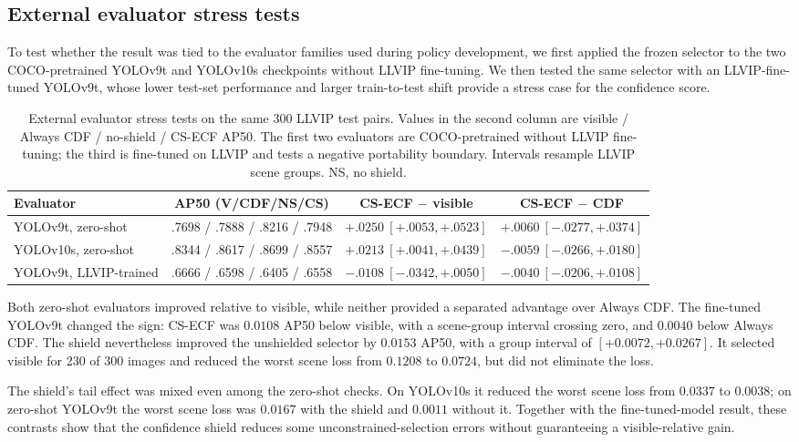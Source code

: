 \documentclass[preprint,11pt]{elsarticle}
\begin{document}
\subsection{External evaluator stress tests}

To test whether the result was tied to the evaluator families used during
policy development, we first applied the frozen selector to the two
COCO-pretrained YOLOv9t and YOLOv10s checkpoints without LLVIP fine-tuning.
We then tested the same selector with an LLVIP-fine-tuned YOLOv9t, whose lower
test-set performance and larger train-to-test shift provide a stress case for
the confidence score.

\begin{table}[t]
\centering
\scriptsize
\setlength{\tabcolsep}{3pt}
\caption{External evaluator stress tests on the same 300 LLVIP test pairs.
Values in the second column are visible / Always CDF / no-shield / CS-ECF AP50.
The first two evaluators are COCO-pretrained without LLVIP fine-tuning; the
third is fine-tuned on LLVIP and tests a negative portability boundary.
Intervals resample LLVIP scene groups. NS, no shield.}
\label{tab:independent}
\begin{tabular}{@{}lccc@{}}
\toprule
Evaluator & AP50 (V/CDF/NS/CS) &
CS-ECF \(-\) visible & CS-ECF \(-\) CDF \\
\midrule
YOLOv9t, zero-shot & .7698 / .7888 / .8216 / .7948 &
\(+.0250~[+.0053,+.0523]\) & \(+.0060~[-.0277,+.0374]\) \\
YOLOv10s, zero-shot & .8344 / .8617 / .8699 / .8557 &
\(+.0213~[+.0041,+.0439]\) & \(-.0059~[-.0266,+.0180]\) \\
YOLOv9t, LLVIP-trained & .6666 / .6598 / .6405 / .6558 &
\(-.0108~[-.0342,+.0050]\) & \(-.0040~[-.0206,+.0108]\) \\
\bottomrule
\end{tabular}
\end{table}

Both zero-shot evaluators improved relative to visible, while neither provided
a separated advantage over Always CDF. The fine-tuned YOLOv9t changed the sign:
CS-ECF was \(0.0108\) AP50 below visible, with a scene-group interval crossing
zero, and \(0.0040\) below Always CDF. The shield nevertheless improved the
unshielded selector by \(0.0153\) AP50, with a group interval of
\([+0.0072,+0.0267]\). It selected visible for 230 of 300 images and reduced
the worst scene loss from \(0.1208\) to \(0.0724\), but did not eliminate the
loss.

The shield's tail effect was mixed even among the zero-shot checks. On
YOLOv10s it reduced the worst scene loss from \(0.0337\) to \(0.0038\);
on zero-shot YOLOv9t the worst scene loss was \(0.0167\) with the shield and
\(0.0011\) without it. Together with the fine-tuned-model result, these
contrasts show that the confidence shield reduces some unconstrained-selection
errors without guaranteeing a visible-relative gain.
\end{document}

